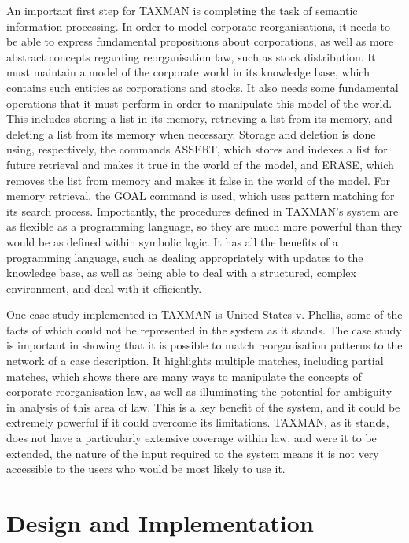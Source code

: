 \documentclass{l4proj}
\begin{document}
An important first step for TAXMAN is completing the task of semantic information processing. In order to model corporate reorganisations, it needs to be able to express fundamental propositions about corporations, as well as more abstract concepts regarding reorganisation law, such as stock distribution. It must maintain a model of the corporate world in its knowledge base, which contains such entities as corporations and stocks. It also needs some fundamental operations that it must perform in order to manipulate this model of the world. This includes storing a list in its memory, retrieving a list from its memory, and deleting a list from its memory when necessary. Storage and deletion is done using, respectively, the commands ASSERT, which stores and indexes a list for future retrieval and makes it true in the world of the model, and ERASE, which removes the list from memory and makes it false in the world of the model. For memory retrieval, the GOAL command is used, which uses pattern matching for its search process. Importantly, the procedures defined in TAXMAN's system are as flexible as a programming language, so they are much more powerful than they would be as defined within symbolic logic. It has all the benefits of a programming language, such as dealing appropriately with updates to the knowledge base, as well as being able to deal with a structured, complex environment, and deal with it efficiently. 

One case study implemented in TAXMAN is United States v. Phellis, some of the facts of which could not be represented in the system as it stands. The case study is important in showing that it is possible to match reorganisation patterns to the network of a case description. It highlights multiple matches, including partial matches, which shows there are many ways to manipulate the concepts of corporate reorganisation law, as well as illuminating the potential for ambiguity in analysis of this area of law. This is a key benefit of the system, and it could be extremely powerful if it could overcome its limitations. TAXMAN, as it stands, does not have a particularly extensive coverage within law, and were it to be extended, the nature of the input required to the system means it is not very accessible to the users who would be most likely to use it. 


\chapter{Design and Implementation}
\end{document}
